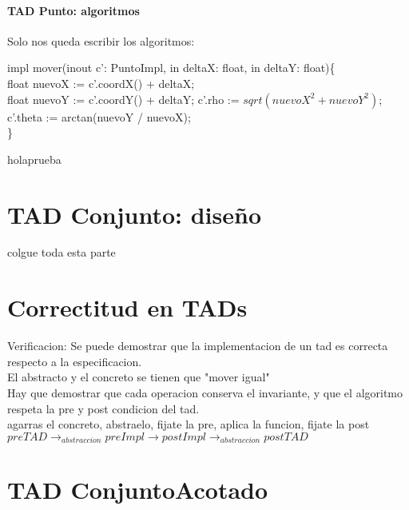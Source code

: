 \documentclass[10pt,a4paper]{article}
\begin{document}
\paragraph*{TAD Punto: algoritmos}Solo nos queda escribir los algoritmos:
\begin{algorithm*}
    impl mover(inout c': PuntoImpl, in deltaX: float, in deltaY: float)\{
        \\float nuevoX := c'.coordX() + deltaX;
        \\float nuevoY := c'.coordY() + deltaY;
        \BlankLine
        c'.rho := $sqrt(nuevoX^2+nuevoY^2)$;
        \\c'.theta := arctan(nuevoY / nuevoX);
    \\\}
\end{algorithm*}
\begin{impl}{hola}{prueba}
\end{impl}
\section*{TAD Conjunto: diseño}
colgue toda esta parte
\section*{Correctitud en TADs}
Verificacion: Se puede demostrar que la implementacion de un tad es correcta respecto a la especificacion.
\\El abstracto y el concreto se tienen que "mover igual"
\\Hay que demostrar que cada operacion conserva el invariante, y que el algoritmo respeta la pre y post condicion del tad.
\\agarras el concreto, abstraelo, fijate la pre, aplica la funcion, fijate la post
\salto{\baselineskip}
$preTAD \rightarrow_{abstraccion} preImpl \rightarrow postImpl \rightarrow_{abstraccion} postTAD$
\section*{TAD ConjuntoAcotado}
\end{document}
